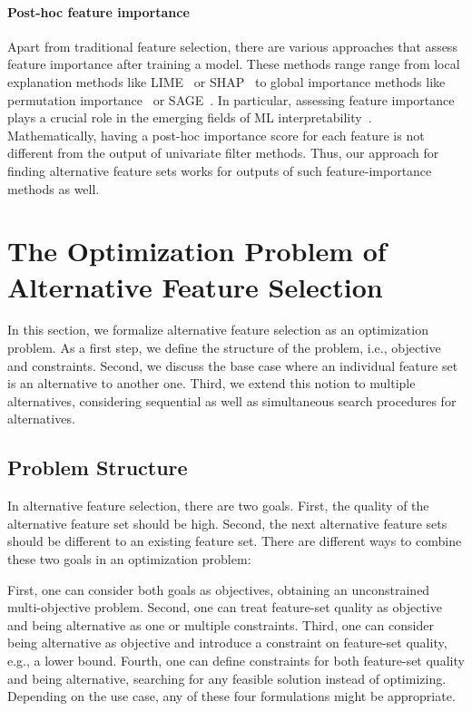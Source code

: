 \documentclass{article}
\theoremstyle{definition}
\begin{document}
\paragraph{Post-hoc feature importance}

Apart from traditional feature selection, there are various approaches that assess feature importance after training a model.
These methods range range from local explanation methods like LIME~\cite{ribeiro2016should} or SHAP~\cite{lundberg2017unified} to global importance methods like permutation importance~\cite{breiman2001random} or SAGE~\cite{covert2020understanding}.
In particular, assessing feature importance plays a crucial role in the emerging fields of ML interpretability~\cite{carvalho2019machine}.
Mathematically, having a post-hoc importance score for each feature is not different from the output of univariate filter methods.
Thus, our approach for finding alternative feature sets works for outputs of such feature-importance methods as well.

\section{The Optimization Problem of Alternative Feature Selection}
\label{sec:problem}

In this section, we formalize alternative feature selection as an optimization problem.
As a first step, we define the structure of the problem, i.e., objective and constraints.
Second, we discuss the base case where an individual feature set is an alternative to another one.
Third, we extend this notion to multiple alternatives, considering sequential as well as simultaneous search procedures for alternatives.

\subsection{Problem Structure}

In alternative feature selection, there are two goals.
First, the quality of the alternative feature set should be high.
Second, the next alternative feature sets should be different to an existing feature set.
There are different ways to combine these two goals in an optimization problem:

First, one can consider both goals as objectives, obtaining an unconstrained multi-objective problem.
Second, one can treat feature-set quality as objective and being alternative as one or multiple constraints.
Third, one can consider being alternative as objective and introduce a constraint on feature-set quality, e.g., a lower bound.
Fourth, one can define constraints for both feature-set quality and being alternative, searching for any feasible solution instead of optimizing.
Depending on the use case, any of these four formulations might be appropriate.
\end{document}
